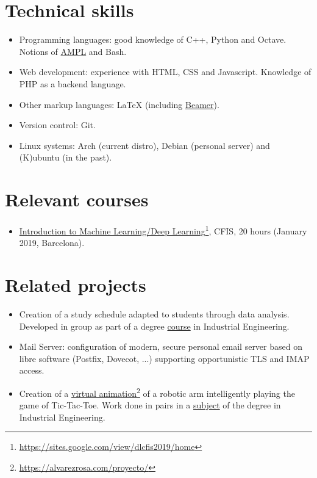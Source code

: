 \documentclass{article}
\newcommand{\davidLink}[2]{\href{#1}{#2}\footnote{\href{#1}{#1}}}
\begin{document}
\section*{Technical skills}

\begin{itemize}
  \item Programming languages: good knowledge of C++, Python and Octave. Notions of
  \href{https://en.wikipedia.org/wiki/AMPL}{AMPL} and Bash.
  \item Web development: experience with HTML, CSS and Javascript. Knowledge of
  PHP as a backend language.
  \item Other markup languages: \textsf{\LaTeX} (including
  \href{https://en.wikipedia.org/wiki/Beamer_(LaTeX)}{Beamer}).
  \item Version control: Git.
  \item Linux systems: Arch (current distro), Debian (personal server) and
  (K)ubuntu (in the past).
\end{itemize}


\section*{Relevant courses}

\begin{itemize}
  \item \davidLink{https://sites.google.com/view/dlcfis2019/home}{Introduction to
    Machine Learning/Deep Learning}, CFIS, 20 hours (January 2019,
  Barcelona).
\end{itemize}


\section*{Related projects}

\begin{itemize}
  \item Creation of a study schedule adapted to students through data
  analysis. Developed in group as part of a degree
  \href{https://www.upc.edu/grau/guiadocent/pdf/ing/240044/project-i.pdf}{course}
  in Industrial Engineering.
  \item Mail Server: configuration of modern, secure personal email server based
  on libre software (Postfix, Dovecot, ...) supporting opportunistic TLS and
  IMAP access.
  \item Creation of a \davidLink{https://alvarezrosa.com/proyecto/}{virtual
    animation} of a robotic arm intelligently playing the game of
  Tic-Tac-Toe. Work done in pairs in a
  \href{https://www.upc.edu/grau/guiadocent/pdf/ing/240044/project-ii.pdf}{subject}
  of the degree in Industrial Engineering.
\end{itemize}
\end{document}
